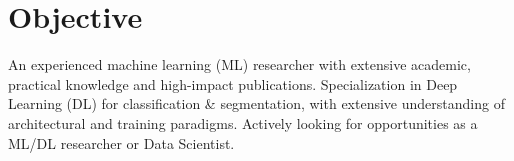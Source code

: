 \section{Objective}
\hspace{1pt}\parbox{0.99\textwidth}{
  An experienced machine learning (ML) researcher with extensive academic, practical knowledge and high-impact publications.
  Specialization in Deep Learning (DL) for classification \& segmentation, with extensive understanding of architectural and training paradigms.
  Actively looking for opportunities as a ML/DL researcher or Data Scientist.
}
